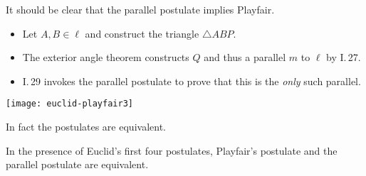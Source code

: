 \begin{minipage}[t]{0.62\linewidth}\vspace{0pt}
It should be clear that the parallel postulate implies Playfair.
\begin{itemize}\itemsep0pt
  \item Let $A,B\in\ell$ and construct the triangle $\triangle ABP$.
  \item The exterior angle theorem constructs $Q$ and thus a parallel $m$ to $\ell$ by I.\,27.
  \item I.\,29 invokes the parallel postulate to prove that this is the \emph{only} such parallel.
\end{itemize}
\end{minipage}
\hfill
\begin{minipage}[t]{0.37\linewidth}\vspace{0pt}
\flushright\texttt{[image: euclid-playfair3]}
\end{minipage}\bigbreak

In fact the postulates are equivalent.

\begin{thm}{}{}
In the presence of Euclid's first four postulates, Playfair's postulate and the parallel postulate are equivalent.
\end{thm}

